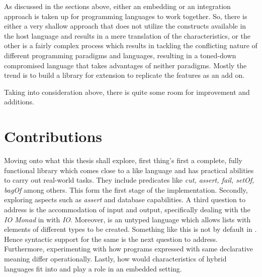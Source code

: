 \documentclass[thesis-solanki.tex]{subfiles}
\begin{document}
As discussed in the sections above, either an embedding or an integration approach is taken up for programming
languages to work together.
So, there is either a very shallow approach that does not utilize the constructs available in the host language and
results in a mere translation of the characteristics, or the other is a fairly complex process which results in
tackling the conflicting nature of different programming paradigms and languages, resulting in a toned-down
compromised language that takes advantages of neither paradigms.
Mostly the trend is to build a library for extension to replicate the features as an add on.

Taking into consideration above, there is quite some room for improvement and additions.
\section{Contributions}

Moving onto what this thesis shall explore, first thing's first a complete, fully functional library which comes
close to a  like language and has practical abilities to carry out real-world tasks.
They include predicates like \textit{cut, assert, fail, setOf, bagOf} among others.
This form
the first stage of the implementation.
Secondly, exploring aspects such as \textit{assert} and database capabilities.
A third question to address is the accommodation of input and output, specifically dealing with the \textit{IO
  Monad} in  with  \textit{IO}.
Moreover,  is an untyped language which allows lists with elements of different types to be
created.
Something like this is not by default in .
Hence syntactic support for the same is the next question to address.
Furthermore, experimenting with how programs expressed with same declarative meaning differ operationally.
Lastly, how would characteristics of hybrid languages fit into and play a role in an embedded setting.
\end{document}
